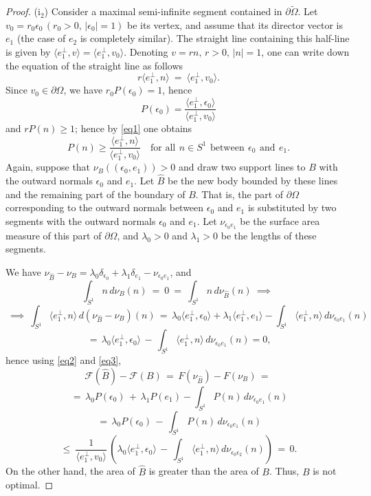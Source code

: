 \documentclass[a4paper,12pt]{article}
\newcommand {\FF}{F}
\newcommand {\FFF}{\mathcal{F}}
\newcommand {\PP}{P}
\theoremstyle{remark}
\theoremstyle{definition}
\begin{document}
\begin{proof}
(i$_2$) Consider a maximal semi-infinite segment contained in $\partial\tilde\Omega$. Let $v_0 = r_0 \epsilon_0\, (r_0>0,\, |\epsilon_0| = 1)$ be its vertex, and assume that its director vector is $e_1$ (the case of $e_2$ is completely similar). The straight line containing this half-line is given by $\langle e_1^\perp, v \rangle = \langle e_1^\perp, v_0 \rangle$. Denoting $v=rn,\, r >0,\, |n|=1$, one can write down the equation of the straight line as follows
\begin{equation}\label{eq1}
r \langle e_1^\perp, n \rangle \ = \ \langle e_1^\perp, v_0 \rangle.
\end{equation}
Since $v_0 \in \partial\Omega$, we have $r_0 \PP(\epsilon_0) = 1$, hence
\begin{equation}\label{eq2}
\PP(\epsilon_0) = \dfrac{\langle e_1^\perp, \epsilon_0 \rangle}{\langle e_1^\perp, v_0 \rangle}
\end{equation}
 and $r \PP(n) \ge 1$; hence by \eqref{eq1} one obtains
\begin{equation}\label{eq3}
\PP(n) \ge \dfrac{\langle e_1^\perp, n \rangle}{\langle e_1^\perp, v_0 \rangle}
 \quad \text{for all} \, \ n \in S^1 \, \ \text{between} \, \ \epsilon_0 \, \ \text{and} \, \ e_1.
\end{equation}
Again, suppose that $\nu_B((\epsilon_0, e_1)) > 0$ and draw two support lines to $B$ with the outward normals $\epsilon_0$ and $e_1$. Let $\hat B$ be the new body bounded by these lines and the remaining part of the boundary of $B$. That is, the part of $\partial\Omega$ corresponding to the outward normals between $\epsilon_0$ and $e_1$ is substituted by two segments with the outward normals $\epsilon_0$ and $e_1$. Let $\nu_{\epsilon_0 e_1}$ be the surface area measure of this part of $\partial\Omega$, and $\lambda_0 > 0$ and $\lambda_1 > 0$ be the lengths of these segments.

We have $\nu_{\hat B} - \nu_B = \lambda_0 \delta_{\epsilon_0} + \lambda_1 \delta_{e_1} - \nu_{\epsilon_0 e_1}$, and
$$
\int_{S^1} n\, d\nu_{B}(n)\ =\ 0 \ =\ \int_{S^1} n\, d\nu_{\hat B}(n) \ \implies \
$$ $$
\ \implies \ \int_{S^1} \langle e_1^\perp, n \rangle \, d(\nu_{\hat B} - \nu_B)(n)\, =\, \lambda_0 \langle e_1^\perp, \epsilon_0 \rangle + \lambda_1 \langle e_1^\perp, e_1 \rangle - \int_{S^1} \langle e_1^\perp, n \rangle \, d\nu_{\epsilon_0 e_1}(n)
$$ $$
\, =\, \lambda_0 \langle e_1^\perp, \epsilon_0 \rangle\, -\, \int_{S^1} \langle e_1^\perp, n \rangle \, d\nu_{\epsilon_0 e_1}(n)
= 0,
$$
hence using \eqref{eq2} and \eqref{eq3},
$$
\FFF(\hat B) - \FFF(B)\, =\, \FF(\nu_{\hat B}) - \FF(\nu_B)\, =\,
$$ $$
\, =\, \lambda_0 \PP(\epsilon_0)\, +\, \lambda_1 \PP(e_1) - \int_{S^1} \PP(n)\, d\nu_{\epsilon_0 e_1}(n)
$$ $$
\, =\, \lambda_0 \PP(\epsilon_0)\, -\, \int_{S^1} \PP(n)\, d\nu_{\epsilon_0 e_1}(n)
$$ $$
\le \ \dfrac{1}{\langle e_1^\perp, v_0 \rangle}\, \left(
\lambda_0 \langle e_1^\perp, \epsilon_0 \rangle\, -\, \int_{S^1} \langle e_1^\perp, n \rangle\, d\nu_{\epsilon_0 \epsilon_2}(n) \right)\, =\, 0.
$$
On the other hand, the area of $\hat B$ is greater than the area of $B$. Thus, $B$ is not optimal.
\vspace{2mm}


\end{proof}
\end{document}
